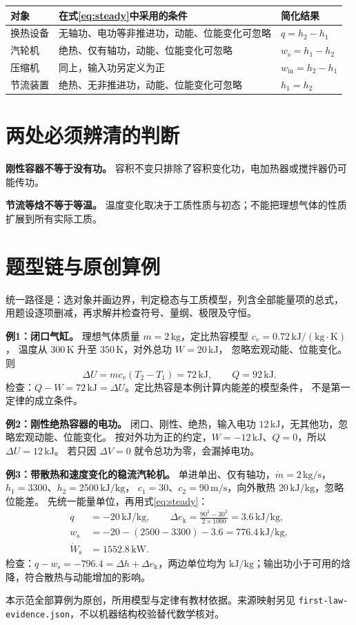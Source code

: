 \documentclass[UTF8,a4paper,11pt,fontset=fandol]{ctexart}
\begin{document}
\begin{tabularx}{\linewidth}{@{}p{2.1cm}Xp{3.5cm}@{}}
\toprule
对象 & 在式\eqref{eq:steady}中采用的条件 & 简化结果 \\
\midrule
换热设备 & 无轴功、电功等非推进功，动能、位能变化可忽略 & $q=h_2-h_1$ \\
汽轮机 & 绝热、仅有轴功，动能、位能变化可忽略 & $w_{\mathrm{s}}=h_1-h_2$ \\
压缩机 & 同上，输入功另定义为正 & $w_{\mathrm{in}}=h_2-h_1$ \\
节流装置 & 绝热、无非推进功，动能、位能变化可忽略 & $h_1=h_2$ \\
\bottomrule
\end{tabularx}

\section{两处必须辨清的判断}
\textbf{刚性容器不等于没有功。}
容积不变只排除了容积变化功，电加热器或搅拌器仍可能传功。

\textbf{节流等焓不等于等温。}
温度变化取决于工质性质与初态；不能把理想气体的性质扩展到所有实际工质。

\section{题型链与原创算例}
统一路径是：选对象并画边界，判定稳态与工质模型，列含全部能量项的总式，
用题设逐项删减，再求解并检查符号、量纲、极限及守恒。

\textbf{例1：闭口气缸。}
理想气体质量 $m=2\,\mathrm{kg}$，定比热容模型 $c_v=0.72\,\mathrm{kJ/(kg\cdot K)}$，
温度从 $300\,\mathrm{K}$ 升至 $350\,\mathrm{K}$，对外总功 $W=20\,\mathrm{kJ}$，
忽略宏观动能、位能变化。则
\[
 \Delta U=mc_v(T_2-T_1)=72\,\mathrm{kJ},\qquad Q=92\,\mathrm{kJ}.
\]
检查：$Q-W=72\,\mathrm{kJ}=\Delta U$。定比热容是本例计算内能差的模型条件，
不是第一定律的成立条件。

\textbf{例2：刚性绝热容器的电功。}
闭口、刚性、绝热，输入电功 $12\,\mathrm{kJ}$，无其他功，忽略宏观动能、位能变化。
按对外功为正的约定，$W=-12\,\mathrm{kJ}$、$Q=0$，所以 $\Delta U=12\,\mathrm{kJ}$。
若只因 $\Delta V=0$ 就令总功为零，会漏掉电功。

\textbf{例3：带散热和速度变化的稳流汽轮机。}
单进单出、仅有轴功，$\dot m=2\,\mathrm{kg/s}$，$h_1=3300$、$h_2=2500\,\mathrm{kJ/kg}$，
$c_1=30$、$c_2=90\,\mathrm{m/s}$，向外散热 $20\,\mathrm{kJ/kg}$，忽略位能差。
先统一能量单位，再用式\eqref{eq:steady}：
\begin{align*}
 q&=-20\,\mathrm{kJ/kg},\qquad
 \Delta e_{\mathrm{k}}=\frac{90^2-30^2}{2\times1000}=3.6\,\mathrm{kJ/kg},\\
 w_{\mathrm{s}}&=-20-(2500-3300)-3.6=776.4\,\mathrm{kJ/kg},\\
 \dot W_{\mathrm{s}}&=1552.8\,\mathrm{kW}.
\end{align*}
检查：$q-w_{\mathrm{s}}=-796.4=\Delta h+\Delta e_{\mathrm{k}}$，两边单位均为
$\mathrm{kJ/kg}$；输出功小于可用的焓降，符合散热与动能增加的影响。

\small 本示范全部算例为原创，所用模型与定律有教材依据。来源映射另见
\texttt{first-law-evidence.json}，不以机器结构校验替代数学核对。
\end{document}
